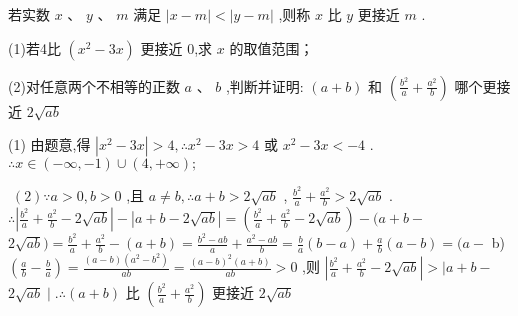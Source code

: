 \documentclass[11pt,a4paper]{article}
\begin{document}
\begin{problem} 
若实数 \(\displaystyle x\text{ 、 }y\text{ 、 }m\) 满足 \(\displaystyle \left| {x - m}\right|  < \left| {y - m}\right|\) ,则称 \(\displaystyle x\) 比 \(\displaystyle y\) 更接近 \(\displaystyle m\) . 

(1)若4比 \(\displaystyle \left( {{x}^{2} - {3x}}\right)\) 更接近 0,求 \(\displaystyle x\) 的取值范围； 

(2)对任意两个不相等的正数 \(\displaystyle a\) 、 \(\displaystyle b\) ,判断并证明: \(\displaystyle \left( {a + b}\right)\) 和 \(\displaystyle \left( {\frac{{b}^{2}}{a} + \frac{{a}^{2}}{b}}\right)\) 哪个更接近 \(\displaystyle 2\sqrt{ab}\) 
\begin{jiexi}[55]
 (1) 由题意,得 \(\displaystyle \left| {{x}^{2} - {3x}}\right|  > 4,\therefore {x}^{2} - {3x} > 4\) 或 \(\displaystyle {x}^{2} - {3x} <  - 4\) . \(\displaystyle \therefore x \in  \left( {-\infty , - 1}\right)  \cup  \left( {4, + \infty }\right) ;\)
 
 \(\displaystyle \;\left( 2\right) \because a > 0,b > 0\) ,且 \(\displaystyle a \neq  b,\therefore a + b > 2\sqrt{ab}\) , \(\displaystyle \frac{{b}^{2}}{a} + \frac{{a}^{2}}{b} > 2\sqrt{ab}\) . \(\displaystyle \therefore \left| {\frac{{b}^{2}}{a} + \frac{{a}^{2}}{b} - 2\sqrt{ab}}\right|  - \left| {a + b - 2\sqrt{ab}}\right|  = \left( {\frac{{b}^{2}}{a} + \frac{{a}^{2}}{b} - 2\sqrt{ab}}\right)  - (a + b -\)  \(\displaystyle 2\sqrt{ab}) = \frac{{b}^{2}}{a} + \frac{{a}^{2}}{b} - \left( {a + b}\right)  = \frac{{b}^{2} - {ab}}{a} + \frac{{a}^{2} - {ab}}{b} = \frac{b}{a}\left( {b - a}\right)  + \frac{a}{b}\left( {a - b}\right)  = (a -\) b) \(\displaystyle \left( {\frac{a}{b} - \frac{b}{a}}\right)  = \frac{\left( {a - b}\right) \left( {{a}^{2} - {b}^{2}}\right) }{ab} = \frac{{\left( a - b\right) }^{2}\left( {a + b}\right) }{ab} > 0\) ,则 \(\displaystyle \left| {\frac{{b}^{2}}{a} + \frac{{a}^{2}}{b} - 2\sqrt{ab}}\right|  >  \mid  a + b -\)  \(\displaystyle 2\sqrt{ab} \mid  .\therefore \left( {a + b}\right)\) 比 \(\displaystyle \left( {\frac{{b}^{2}}{a} + \frac{{a}^{2}}{b}}\right)\) 更接近 \(\displaystyle 2\sqrt{ab}\)


\end{jiexi}
\end{problem}
\end{document}

